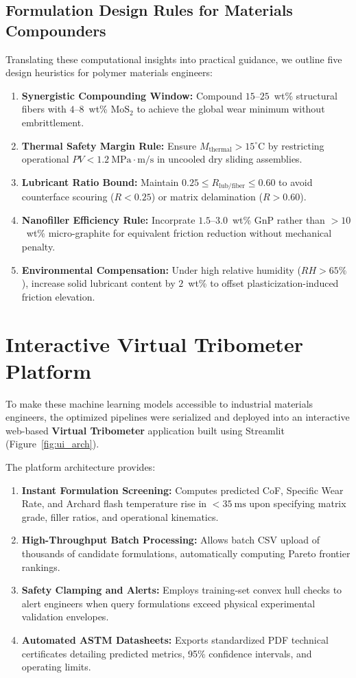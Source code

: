 \documentclass[10pt,twocolumn,a4paper]{article}
\begin{document}
\subsection{Formulation Design Rules for Materials Compounders}
Translating these computational insights into practical guidance, we outline five design heuristics for polymer materials engineers:
\begin{enumerate}
    \item \textbf{Synergistic Compounding Window:} Compound $15$--$25$~wt\% structural fibers with $4$--$8$~wt\% $\text{MoS}_2$ to achieve the global wear minimum without embrittlement.
    \item \textbf{Thermal Safety Margin Rule:} Ensure $M_{\text{thermal}} > 15^\circ\text{C}$ by restricting operational $PV < 1.2~\text{MPa}\cdot\text{m/s}$ in uncooled dry sliding assemblies.
    \item \textbf{Lubricant Ratio Bound:} Maintain $0.25 \le R_{\text{lub/fiber}} \le 0.60$ to avoid counterface scouring ($R < 0.25$) or matrix delamination ($R > 0.60$).
    \item \textbf{Nanofiller Efficiency Rule:} Incorprate $1.5$--$3.0$~wt\% GnP rather than $> 10$~wt\% micro-graphite for equivalent friction reduction without mechanical penalty.
    \item \textbf{Environmental Compensation:} Under high relative humidity ($RH > 65\%$), increase solid lubricant content by $2$~wt\% to offset plasticization-induced friction elevation.
\end{enumerate}

\section{Interactive Virtual Tribometer Platform}
\label{sec:deployment}
To make these machine learning models accessible to industrial materials engineers, the optimized pipelines were serialized and deployed into an interactive web-based \textbf{Virtual Tribometer} application built using Streamlit (Figure~\ref{fig:ui_arch}).

The platform architecture provides:
\begin{enumerate}
    \item \textbf{Instant Formulation Screening:} Computes predicted CoF, Specific Wear Rate, and Archard flash temperature rise in $< 35~\text{ms}$ upon specifying matrix grade, filler ratios, and operational kinematics.
    \item \textbf{High-Throughput Batch Processing:} Allows batch CSV upload of thousands of candidate formulations, automatically computing Pareto frontier rankings.
    \item \textbf{Safety Clamping and Alerts:} Employs training-set convex hull checks to alert engineers when query formulations exceed physical experimental validation envelopes.
    \item \textbf{Automated ASTM Datasheets:} Exports standardized PDF technical certificates detailing predicted metrics, 95\% confidence intervals, and operating limits.
\end{enumerate}
\end{document}
